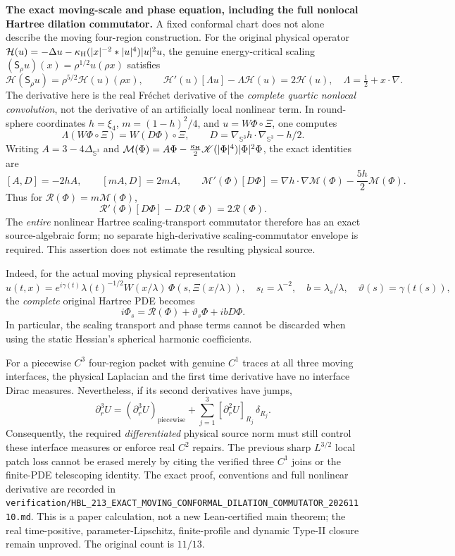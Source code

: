 \documentclass[11pt]{amsart}
\begin{document}
\medskip
\noindent\textbf{The exact moving-scale and phase equation, including the full nonlocal Hartree dilation commutator.}
A fixed conformal chart does not alone describe the moving
four-region construction. For the original physical operator
\(\mathcal H(u)=-\Delta u-\kappa_{\rm H}(|x|^{-2}*|u|^4)|u|^2u\),
the genuine energy-critical scaling
\((\mathsf S_\rho u)(x)=\rho^{1/2}u(\rho x)\) satisfies
\[
 \mathcal H(\mathsf S_\rho u)
   =\rho^{5/2}\mathcal H(u)(\rho x),\qquad
 \mathcal H'(u)[\Lambda u]-\Lambda\mathcal H(u)
   =2\mathcal H(u),\quad \Lambda=\tfrac12+x\cdot\nabla .
\]
The derivative here is the real Fr\'echet derivative of the
\emph{complete quartic nonlocal convolution}, not the derivative of
an artificially local nonlinear term. In round-sphere coordinates
\(h=\xi_4\), \(m=(1-h)^2/4\), and
\(u=W\Phi\circ\Xi\), one computes
\[
 \Lambda(W\Phi\circ\Xi)=W(D\Phi)\circ\Xi,\qquad
 D=\nabla_{\mathbb S^3}h\cdot\nabla_{\mathbb S^3}-h/2 .
\]
Writing \(A=3-4\Delta_{\mathbb S^3}\) and
\(\mathcal M(\Phi)=A\Phi-
 \frac{\kappa_{\rm H}}2\mathscr K(|\Phi|^4)|\Phi|^2\Phi\),
the exact identities are
\[
 [A,D]=-2hA,\qquad [mA,D]=2mA,\qquad
 \mathcal M'(\Phi)[D\Phi]
   =\nabla h\cdot\nabla\mathcal M(\Phi)
     -\frac{5h}{2}\mathcal M(\Phi).
\]
Thus for \(\mathcal R(\Phi)=m\mathcal M(\Phi)\),
\[
 \mathcal R'(\Phi)[D\Phi]-D\mathcal R(\Phi)
   =2\mathcal R(\Phi).
\]
The \emph{entire} nonlinear Hartree scaling-transport commutator
therefore has an exact source-algebraic form; no separate
high-derivative scaling-commutator envelope is required.
This assertion does not estimate the resulting physical source.

Indeed, for the actual moving physical representation
\[
 u(t,x)=e^{i\gamma(t)}\lambda(t)^{-1/2}
 W(x/\lambda)\,
 \Phi(s,\Xi(x/\lambda)),\quad
 s_t=\lambda^{-2},\quad
 b=\lambda_s/\lambda,\quad
 \vartheta(s)=\gamma(t(s)),
\]
the \emph{complete} original Hartree PDE becomes
\[
 \boxed{\quad
 i\Phi_s=\mathcal R(\Phi)+\vartheta_s\Phi+i bD\Phi .
 \quad}
\]
In particular, the scaling transport and phase terms cannot be
discarded when using the static Hessian's spherical harmonic
coefficients.

For a piecewise \(C^3\) four-region packet with genuine \(C^1\)
traces at all three moving interfaces, the physical Laplacian
and the first time derivative have no interface Dirac measures.
Nevertheless, if its second derivatives have jumps,
\[
 \partial_r^3 U
 =(\partial_r^3U)_{\mathrm{piecewise}}
 +\sum_{j=1}^3[\partial_r^2U]_{R_j}\,\delta_{R_j}.
\]
Consequently, the required \emph{differentiated} physical source
norm must still control these interface measures or enforce real
\(C^2\) repairs. The previous sharp \(L^{3/2}\) local patch loss
cannot be erased merely by citing the verified three \(C^1\)
joins or the finite-PDE telescoping identity.
The exact proof, conventions and full nonlinear derivative are
recorded in
\texttt{verification/HBL\_213\_EXACT\_MOVING\_CONFORMAL\_DILATION\_COMMUTATOR\_20261110.md}.
This is a paper calculation, not a new Lean-certified main theorem;
the real time-positive, parameter-Lipschitz, finite-profile and
dynamic Type-II closure remain unproved. The original count is \(11/13\).
\end{document}
